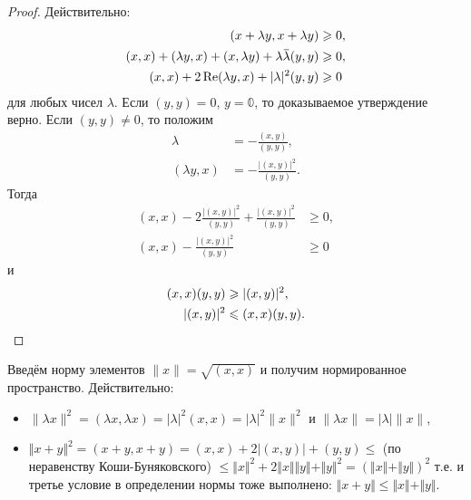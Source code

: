 \documentclass[12pt,a4paper,titlepage,oneside]{book}
\newcommand{\overbar}[1]{\mkern 1.5mu\overline{\mkern-1.5mu#1\mkern-1.5mu}\mkern 1.5mu}
\renewcommand{\Re}{\operatorname{Re}}
\theoremstyle{definition}
\theoremstyle{plain}
\theoremstyle{break}
\theoremstyle{remark}
\theoremstyle{remark}
\theoremstyle{remark}
\theoremstyle{remark}
\theoremstyle{plain}
\theoremstyle{plain}
\begin{document}
\begin{proof}
Действительно:
\begin{align*}
(x + \lambda y, x + \lambda y) &\geqslant 0,\\
(x, x) + (\lambda y, x) + (x, \lambda y) + \lambda \overbar{\lambda} (y, y) &\geqslant 0,\\
(x,x) + 2 \Re(\lambda y, x) + \lvert \lambda \rvert^2 (y, y) &\geqslant 0\\
\end{align*}
для любых чисел $\lambda$.
Если $(y, y) = 0$, $y = \mathbb{0}$, то доказываемое утверждение верно. Если $(y, y) \neq 0$, то положим 
\begin{align*}
\lambda &= - \frac{(x, y)}{(y, y)},\\
(\lambda y, x) &= - \frac{ \lvert (x, y)\rvert^2}{(y, y)}.
\end{align*}
Тогда
\begin{align*}
(x, x) - 2 \frac{ \lvert (x, y) \rvert^2}{(y, y)} + \frac{\lvert (x, y) \rvert^2}{(y, y)} &\geqslant 0,\\
(x, x) - \frac{\lvert (x, y) \rvert^2}{(y, y)} &\geqslant 0
\end{align*}
и
\begin{align*}
(x, x) (y, y) &\geqslant \lvert (x, y) \rvert^2,\\
\lvert (x, y) \rvert^2 &\leqslant (x, x) (y, y).
\qedhere
\end{align*}
\end{proof}

Введём норму элементов $\lVert x \rVert = \sqrt{(x, x)}$ и получим нормированное пространство. Действительно:

\begin{itemize}

	\item $\lVert \lambda x \rVert^2 = (\lambda x, \lambda x) = \lvert \lambda \rvert^2 (x, x) = \lvert \lambda \rvert^2 \lVert x \rVert^2$ и $\lVert \lambda x \rVert = \lvert \lambda \rvert \lVert x \rVert$,
	
	\item $\Vert x + y \Vert^2 = (x + y, x + y) = (x, x) + 2 \lvert (x, y) \rvert + (y, y) \leqslant$ (по неравенству Коши-Буняковского) $\leqslant \Vert x \Vert^2 + 2 \Vert x \Vert \Vert y \Vert + \Vert y \Vert^2 = (\Vert x \Vert + \Vert y \Vert)^2$ т.е. и третье условие в определении нормы тоже выполнено: $\Vert x + y \Vert \leqslant \Vert x \Vert + \Vert y \Vert$.

\end{itemize}
\end{document}
